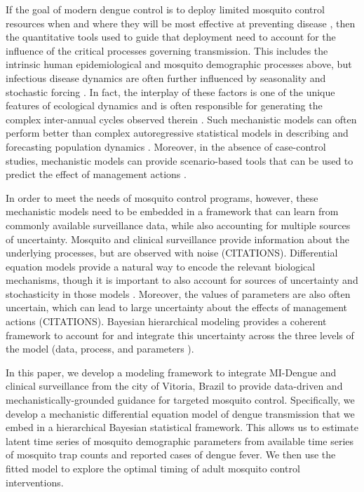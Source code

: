 \documentclass[10pt,letterpaper]{article}
\begin{document}
If the goal of modern dengue control is to deploy limited mosquito control resources when and where they will be most effective at preventing disease \cite{Scott2010a, Scott2010b}, then the quantitative tools used to guide that deployment need to account for the influence of the critical processes governing transmission.
This includes the intrinsic human epidemiological and mosquito demographic processes above, but infectious disease dynamics are often further influenced by seasonality and stochastic forcing \cite{Ellner1998,Koelle2004, Grenfell2002}.
In fact, the interplay of these factors is one of the unique features of ecological dynamics and is often responsible for generating the complex inter-annual cycles observed therein \cite{Bjornstad2001}.
Such mechanistic models can often perform better than complex autoregressive statistical models in describing and forecasting population dynamics \cite{Reilly2005}.
Moreover, in the absence of case-control studies, mechanistic models can provide scenario-based tools that can be used to predict the effect of management actions \cite{Buckland2007}.

In order to meet the needs of mosquito control programs, however, these mechanistic models need to be embedded in a framework that can learn from commonly available surveillance data, while also accounting for multiple sources of uncertainty.
Mosquito and clinical surveillance provide information about the underlying processes, but are observed with noise (CITATIONS).
Differential equation models provide a natural way to encode the relevant biological mechanisms, though it is important to also account for sources of uncertainty and stochasticity in those models \cite{Hotelling1927, Wikle2010}.
Moreover, the values of parameters are also often uncertain, which can lead to large uncertainty about the effects of management actions (CITATIONS).
Bayesian hierarchical modeling provides a coherent framework to account for and integrate this uncertainty across the three levels of the model (data, process, and parameters \cite{Berliner1996, Cressie2009}).
 
In this paper, we develop a modeling framework to integrate MI-Dengue and clinical surveillance from the city of Vitoria, Brazil to provide data-driven and mechanistically-grounded guidance for targeted mosquito control.
Specifically, we develop a mechanistic differential equation model of dengue transmission that we embed in a hierarchical Bayesian statistical framework.
This allows us to estimate latent time series of mosquito demographic parameters from available time series of mosquito trap counts and reported cases of dengue fever.
We then use the fitted model to explore the optimal timing of adult mosquito control interventions.
\end{document}
